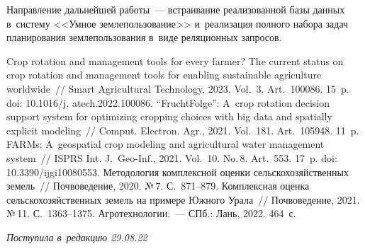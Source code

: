 \begin{multicols}{2}
    Направление дальнейшей работы~--- встраивание реализованной базы 
данных в~сис\-те\-му <<Умное землепользование>> и~реализация пол\-но\-го 
набора задач планирования землепользования в~виде реляционных запросов.
    
{\small\frenchspacing
 {%
 \begin{thebibliography}{9}
 Crop rotation and management tools 
for every farmer? The current status on crop rotation and management tools for enabling 
sustainable agriculture worldwide~// Smart Agricultural Technology, 2023. Vol.~3. 
Art.\ 100086. 15~p. doi: 10.1016/j. atech.2022.100086.
 ``FruchtFolge'': A~crop rotation decision support system for 
optimizing cropping choices with big data and spatially explicit modeling~// Comput. 
Electron. Agr., 2021. Vol.~181. Art.\ 105948. 11~p.
 FARMs: A~geospatial crop modeling and agricultural water 
management system~// ISPRS Int. J.~Geo-Inf., 2021. Vol.~10. No.\,8. 
Art.\ 553. 17~p. doi: 10.3390/ijgi10080553.
 Методология комплексной оцен\-ки сельскохозяйственных земель~// 
Почвоведение, 2020. №\,7. С.~871--879.
 Комплексная оцен\-ка 
сельскохозяйственных земель на примере Южного Урала~// Почвоведение, 2021. №\,11. 
С.~1363--1375.
 Агротехнологии.~--- СПб.: Лань, 2022. 464~с. 
\end{thebibliography}

 }
 }

\end{multicols}

\vspace*{-6pt}

\hfill{\small\textit{Поступила в~редакцию 29.08.22}}



\newpage

\vspace*{-28pt}





